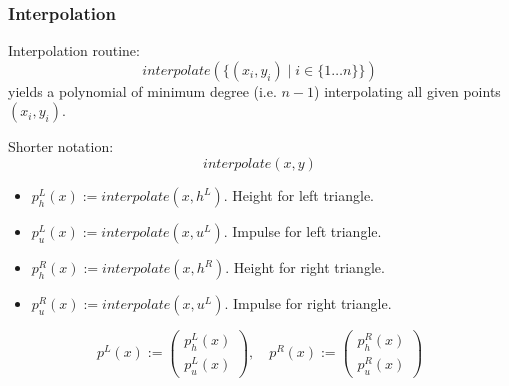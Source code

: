 \documentclass{beamer}
\begin{document}
\begin{frame}
  \frametitle{Interpolation}
  Interpolation routine:
  \begin{equation*}
    interpolate(\{(x_i,y_i) \mid i \in \{1 \dots n\}\})
  \end{equation*}
  yields a polynomial of minimum degree (i.e. $n-1$) interpolating all given points $(x_i,y_i)$.

  Shorter notation: 
  \begin{equation*}
    interpolate(x,y)
  \end{equation*}

  \begin{itemize}
  \item $p^L_h(x) := interpolate (x,h^L)$. Height for left triangle.
  \item $p^L_u(x) := interpolate (x,u^L)$. Impulse for left triangle.
  \item $p^R_h(x) := interpolate (x,h^R)$. Height for right triangle.
  \item $p^R_u(x) := interpolate (x,u^L)$. Impulse for right triangle.
  \end{itemize}

  \begin{equation*}
    p^L(x) :=
    \begin{pmatrix}
      p^L_h(x) \\ p^L_u(x)
    \end{pmatrix}, \quad
    p^R(x) :=
    \begin{pmatrix}
      p^R_h(x) \\ p^R_u(x)
    \end{pmatrix}
  \end{equation*}
\end{frame}
\end{document}
